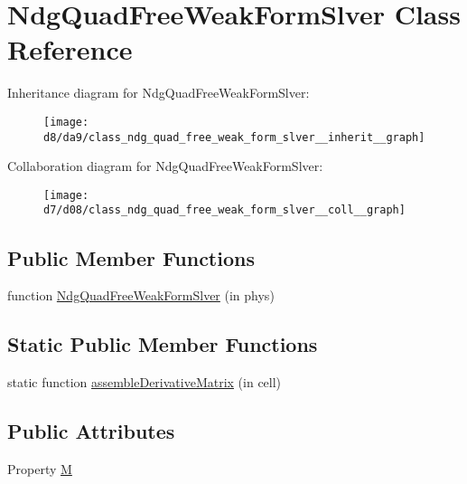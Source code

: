 \hypertarget{class_ndg_quad_free_weak_form_slver}{}\section{Ndg\+Quad\+Free\+Weak\+Form\+Slver Class Reference}
\label{class_ndg_quad_free_weak_form_slver}


Inheritance diagram for Ndg\+Quad\+Free\+Weak\+Form\+Slver\+:
\nopagebreak
\begin{figure}[H]
\begin{center}
\leavevmode
\texttt{[image: d8/da9/class\_ndg\_quad\_free\_weak\_form\_slver\_\_inherit\_\_graph]}
\end{center}
\end{figure}


Collaboration diagram for Ndg\+Quad\+Free\+Weak\+Form\+Slver\+:
\nopagebreak
\begin{figure}[H]
\begin{center}
\leavevmode
\texttt{[image: d7/d08/class\_ndg\_quad\_free\_weak\_form\_slver\_\_coll\_\_graph]}
\end{center}
\end{figure}
\subsection*{Public Member Functions}
\begin{DoxyCompactItemize}
\item 
function \hyperlink{class_ndg_quad_free_weak_form_slver_a1c2691f7d2c9e231ed9a63eade7aad03}{Ndg\+Quad\+Free\+Weak\+Form\+Slver} (in phys)
\end{DoxyCompactItemize}
\subsection*{Static Public Member Functions}
\begin{DoxyCompactItemize}
\item 
static function \hyperlink{class_ndg_quad_free_weak_form_slver_a8ec15aaab8f33714ca17d309c70b9aa7}{assemble\+Derivative\+Matrix} (in cell)
\end{DoxyCompactItemize}
\subsection*{Public Attributes}
\begin{DoxyCompactItemize}
\item 
Property \hyperlink{class_ndg_quad_free_weak_form_slver_adb8fdadbf242325043863007957e0b3c}{M}
\end{DoxyCompactItemize}
